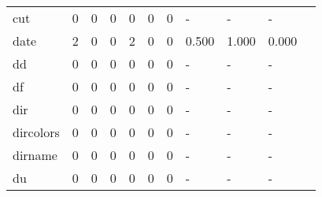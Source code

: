 \begin{longtable}{lp{1.10cm}p{1.10cm}p{1.10cm}p{1.10cm}p{1.10cm}p{1.10cm}p{1.10cm}p{1.10cm}p{1.10cm}p{1.10cm}}
cut       &                      0 &                                  0 &                                 0 &                                0 &                                 0 &                               0 &                              - &                                     - &                                   - \\
date      &                      2 &                                  0 &                                 0 &                                2 &                                 0 &                               0 &                          0.500 &                                 1.000 &                               0.000 \\
dd        &                      0 &                                  0 &                                 0 &                                0 &                                 0 &                               0 &                              - &                                     - &                                   - \\
df        &                      0 &                                  0 &                                 0 &                                0 &                                 0 &                               0 &                              - &                                     - &                                   - \\
dir       &                      0 &                                  0 &                                 0 &                                0 &                                 0 &                               0 &                              - &                                     - &                                   - \\
dircolors &                      0 &                                  0 &                                 0 &                                0 &                                 0 &                               0 &                              - &                                     - &                                   - \\
dirname   &                      0 &                                  0 &                                 0 &                                0 &                                 0 &                               0 &                              - &                                     - &                                   - \\
du        &                      0 &                                  0 &                                 0 &                                0 &                                 0 &                               0 &                              - &                                     - &                                   - \\

\end{longtable}
